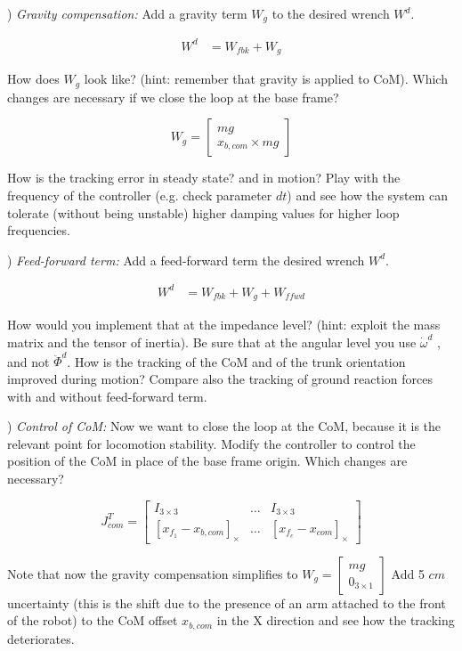 \documentclass[11pt]{article}
\newcommand{\mat}[1]{\ensuremath{\begin{bmatrix}#1\end{bmatrix}}}	%
\begin{document}
) \textit{Gravity compensation:}
Add a gravity term $W_g$ to the desired wrench $W^d$.

\begin{align}
W^d &= W_{fbk} +  W_g
\end{align}

How does $W_g$ look like? (hint: remember that gravity is applied to CoM). Which changes are necessary if we close the loop at the base frame?

\begin{equation}
W_g = \mat{mg \\ x_{b,com} \times mg}
\end{equation}

How is the tracking error in steady state? and in motion? 
Play with the frequency of the controller (e.g. check parameter $dt$) and see how the system can tolerate (without being unstable)  higher damping values for higher loop frequencies.


) \textit{Feed-forward term:}
Add a feed-forward term the desired wrench $W^d$. 

\begin{align}
W^d &= W_{fbk} +  W_g + W_{ffwd}
\end{align}

How would you implement that at the impedance level? (hint: exploit the mass matrix and the tensor of inertia). Be sure that at the angular level you use $\dot{\omega}^d$ , and not $\ddot{\Phi}^d$.
How is the tracking of the CoM and of the trunk orientation improved during motion? 
Compare also the tracking of ground reaction  forces with and without feed-forward term.



\quad

) \textit{Control of CoM:}
Now we want to close the loop at the CoM, because it is the relevant point for locomotion stability. Modify the controller to control the position of the CoM in place of the base frame origin.
Which changes are necessary?


\begin{equation}
J_{com}^T = \mat{I_{3\times3} & \dots & I_{3\times3} \\
	[x_{f_1} - x_{b,com}]_{\times} & \dots & [x_{f_c} - x_{com}]_{\times}}
\end{equation}

Note that now  the gravity compensation simplifies to $W_g = \mat{ mg \\ 0_{3 \times 1} }$
Add 5 $cm$ uncertainty (this is the shift due to the presence of an arm attached to the front of the robot) to the CoM offset $x_{b,com}$ in the X direction and see how the tracking deteriorates. 
\end{document}
